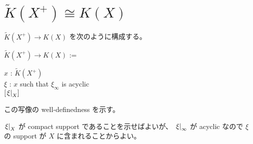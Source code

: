 \documentclass[dvipdfmx]{jsarticle}
\begin{document}
\section*{\(\tilde{K}(X^+) \cong K(X)\)}
\(\tilde{K}(X^+) \to K(X)\) を次のように構成する。

\begin{Definition}
  \itemdefi \Define \(\tilde{K}(X^+) \to K(X)\) :=
  \begin{indentblock}
    \For \(x\) : \(\tilde{K}(X^+)\) \\
    \Take \(\xi\) : \(x\) such that \(\xi_{\infty}\) is acyclic \\
    \Return \([\left. {\xi} \right| _{X}]\)
  \end{indentblock}
\end{Definition}

この写像の well-definedness を示す。

\begin{Proof}
\itemprof
  \(\left. {\xi} \right| _{X}\) が compact support であることを示せばよいが、 \(\left. {\xi} \right| _{\infty}\) が acyclic なので \(\xi\) の support が \(X\) に含まれることからよい。
\end{Proof}
\end{document}
